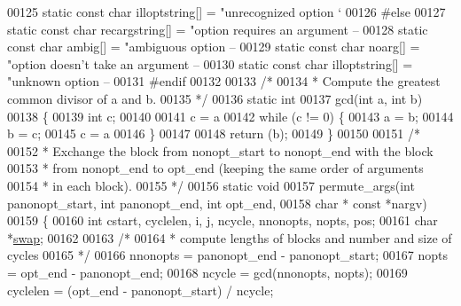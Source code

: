 \begin{DoxyCode}
{{{{{{00125 \textcolor{keyword}{static} \textcolor{keyword}{const} \textcolor{keywordtype}{char} illoptstring[] = \textcolor{stringliteral}{"unrecognized option `%
00126 \textcolor{preprocessor}{#else}
00127 \textcolor{keyword}{static} \textcolor{keyword}{const} \textcolor{keywordtype}{char} recargstring[] = \textcolor{stringliteral}{"option requires an argument -- %
00128 \textcolor{keyword}{static} \textcolor{keyword}{const} \textcolor{keywordtype}{char} ambig[] = \textcolor{stringliteral}{"ambiguous option -- %
00129 \textcolor{keyword}{static} \textcolor{keyword}{const} \textcolor{keywordtype}{char} noarg[] = \textcolor{stringliteral}{"option doesn't take an argument -- %
00130 \textcolor{keyword}{static} \textcolor{keyword}{const} \textcolor{keywordtype}{char} illoptstring[] = \textcolor{stringliteral}{"unknown option -- %
00131 \textcolor{preprocessor}{#endif}
00132 
00133 \textcolor{comment}{/*}
00134 \textcolor{comment}{ * Compute the greatest common divisor of a and b.}
00135 \textcolor{comment}{ */}
00136 \textcolor{keyword}{static} \textcolor{keywordtype}{int}
00137 gcd(\textcolor{keywordtype}{int} a, \textcolor{keywordtype}{int} b)
00138 \{
00139     \textcolor{keywordtype}{int} c;
00140 
00141     c = a %
00142     \textcolor{keywordflow}{while} (c != 0) \{
00143         a = b;
00144         b = c;
00145         c = a %
00146     \}
00147 
00148     \textcolor{keywordflow}{return} (b);
00149 \}
00150 
00151 \textcolor{comment}{/*}
00152 \textcolor{comment}{ * Exchange the block from nonopt\_start to nonopt\_end with the block}
00153 \textcolor{comment}{ * from nonopt\_end to opt\_end (keeping the same order of arguments}
00154 \textcolor{comment}{ * in each block).}
00155 \textcolor{comment}{ */}
00156 \textcolor{keyword}{static} \textcolor{keywordtype}{void}
00157 permute\_args(\textcolor{keywordtype}{int} panonopt\_start, \textcolor{keywordtype}{int} panonopt\_end, \textcolor{keywordtype}{int} opt\_end,
00158     \textcolor{keywordtype}{char} * \textcolor{keyword}{const} *nargv)
00159 \{
00160     \textcolor{keywordtype}{int} cstart, cyclelen, i, j, ncycle, nnonopts, nopts, pos;
00161     \textcolor{keywordtype}{char} *\hyperlink{endian_8c_a3ca5ecd34b04d6a243c054ac3a57f68d}{swap};
00162 
00163     \textcolor{comment}{/*}
00164 \textcolor{comment}{     * compute lengths of blocks and number and size of cycles}
00165 \textcolor{comment}{     */}
00166     nnonopts = panonopt\_end - panonopt\_start;
00167     nopts = opt\_end - panonopt\_end;
00168     ncycle = gcd(nnonopts, nopts);
00169     cyclelen = (opt\_end - panonopt\_start) / ncycle;
}}}}}}}}}}}
\end{DoxyCode}
